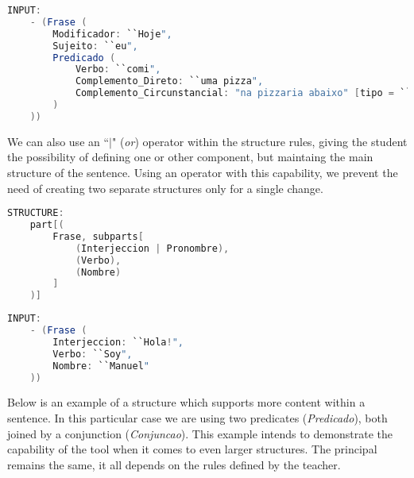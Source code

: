 \begin{center}
\begin{minipage}{15cm}
\begin{lstlisting}[language=java, basicstyle=\small, label={lst:example_input3}, caption=Example of a sentence input]
INPUT:
    - (Frase (
        Modificador: ``Hoje",
        Sujeito: ``eu",
        Predicado (
            Verbo: ``comi",
            Complemento_Direto: ``uma pizza",
            Complemento_Circunstancial: "na pizzaria abaixo" [tipo = ``lugar"]
        )
    ))
\end{lstlisting}
\end{minipage}
\end{center}


We can also use an ``\emph{\(|\)}" (\textit{or}) operator within the structure rules, giving the student the possibility of defining one or other component,
but maintaing the main structure of the sentence. 
Using an operator with this capability, we prevent the need of creating two separate structures only for a single change. 

\begin{center}
\begin{minipage}{10cm}
\begin{lstlisting}[language=java, basicstyle=\small, label={lst:example_structure4}, caption=Example of a sentence structure]
STRUCTURE:
    part[(
        Frase, subparts[
            (Interjeccion | Pronombre),
            (Verbo),
            (Nombre)
        ]
    )]
\end{lstlisting}
\end{minipage}
\end{center}

\begin{center}
\begin{minipage}{10cm}
\begin{lstlisting}[language=java, basicstyle=\small, label={lst:example_input4}, caption=Example of a sentence input]
INPUT:
    - (Frase (
        Interjeccion: ``Hola!",
        Verbo: ``Soy",
        Nombre: ``Manuel"
    ))
\end{lstlisting}
\end{minipage}
\end{center}


Below is an example of a structure which supports more content within a sentence.
In this particular case we are using two predicates (\textit{Predicado}), both joined by a conjunction (\textit{Conjuncao}).
This example intends to demonstrate the capability of the tool when it comes to even larger structures.
The principal remains the same, it all depends on the rules defined by the teacher.

